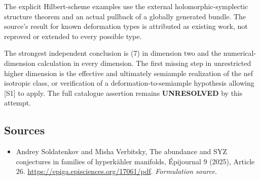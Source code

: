 \documentclass[11pt]{article}
\begin{document}
The explicit Hilbert-scheme examples use the external holomorphic-symplectic structure theorem and an actual pullback of a globally generated bundle. The source's result for known deformation types is attributed as existing work, not reproved or extended to every possible type.

The strongest independent conclusion is (7) in dimension two and the numerical-dimension calculation in every dimension. The first missing step in unrestricted higher dimension is the effective and ultimately semiample realization of the nef isotropic class, or verification of a deformation-to-semiample hypothesis allowing [S1] to apply. The full catalogue assertion remains \textbf{UNRESOLVED} by this attempt.

\subsection{Sources}
\begin{itemize}
\item[S1]Andrey Soldatenkov and Misha Verbitsky, The abundance and SYZ conjectures in families of hyperkähler manifolds, Épijournal 9 (2025), Article 26.
\url{https://epiga.episciences.org/17061/pdf}.
\textit{Formulation source.}
\end{itemize}
\end{document}
